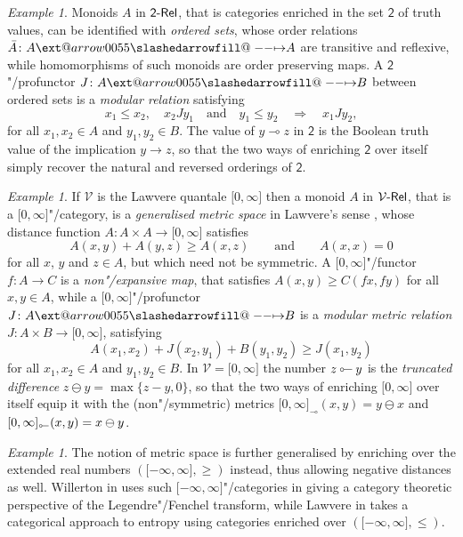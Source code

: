 \documentclass[preprint, a4paper]{elsarticle}
\makeatletter
\def\slashedarrowfill@#1#2#3#4#5{%
  $\m@th\thickmuskip0mu\medmuskip\thickmuskip\thinmuskip\thickmuskip
   \relax#5#1\mkern-7mu%
   \cleaders\hbox{$#5\mkern-2mu#2\mkern-2mu$}\hfill
   \mathclap{#3}\mathclap{#2}%
   \cleaders\hbox{$#5\mkern-2mu#2\mkern-2mu$}\hfill
   \mkern-7mu#4$%
}
\def\rightslashedarrowfill@{%
  \slashedarrowfill@\relbar\relbar\mapstochar\rightarrow}
\newcommand\xslashedrightarrow[2][]{%
  \ext@arrow 0055{\rightslashedarrowfill@}{#1}{#2}}
\def\slashedrightarrow{\xslashedrightarrow{}}
\newcommand{\dashcirc}{\multimap}
\newcommand{\circdash}{\mathbin{\text{\reflectbox{$\multimap$}}}}
\theoremstyle{definition}
\theoremstyle{remark}
\newtheorem{example}[theorem]{Example}
\renewcommand{\implies}{\Rightarrow}
\providecommand{\tdiff}{\ominus}
\providecommand{\brcs}[1]{\lbrace #1 \rbrace}
\providecommand{\brks}[1]{\lbrack #1 \rbrack}
\providecommand{\set}[1]{\brcs{#1}}
\providecommand{\map}[3]{#1\colon#2\to#3}
\providecommand{\hmap}[3]{#1\colon#2\slashedrightarrow#3}
\providecommand{\catvar}[1]{\mathcal{#1}}
\providecommand{\2}{\mathsf 2}
\providecommand{\V}{\catvar V}
\providecommand{\Rel}{\mathsf{Rel}}
\providecommand{\enRel}[1]{#1\text-\Rel}
\makeatother
\begin{document}
	\begin{example} \label{modular relation}
  	Monoids $A$ in $\enRel\2$, that is categories enriched in the set $\2$ of truth values, can be identified with \emph{ordered sets}, whose order relations $\hmap{\bar A}AA$ are transitive and reflexive, while homomorphisms of such monoids are order preserving maps. A $\2$"/profunctor $\hmap JAB$ between ordered sets is a \emph{modular relation} satisfying
  	\begin{displaymath}
  		x_1 \leq x_2, \quad x_2Jy_1 \quad \text{and} \quad y_1 \leq y_2 \quad \implies \quad x_1Jy_2,
  	\end{displaymath}
  	for all $x_1, x_2 \in A$ and $y_1, y_2 \in B$. The value of $y \dashcirc z$ in $\2$ is the Boolean truth value of the implication $y \to z$, so that the two ways of enriching $\2$ over itself simply recover the natural and reversed orderings of $\2$.
  \end{example}
  
  \begin{example}	\label{non-expansive relation}
  	If $\V$ is the Lawvere quantale $\brks{0, \infty}$ then a monoid $A$ in $\enRel\V$, that is a $\brks{0, \infty}$"/category, is a \emph{generalised metric space} in Lawvere's sense \cite{Lawvere73}, whose distance function $\map A{A \times A}{\brks{0, \infty}}$ satisfies
  	\begin{displaymath}
  		A(x, y) + A(y, z) \geq A(x, z) \qquad \text{and} \qquad A(x, x) = 0
  	\end{displaymath}
  	for all $x$, $y$ and $z \in A$, but which need not be symmetric. A $\brks{0, \infty}$"/functor $\map fAC$ is a \emph{non"/expansive map}, that satisfies $A(x,y) \geq C(fx, fy)$ for all $x, y \in A$, while a $\brks{0, \infty}$"/profunctor $\hmap JAB$ is a \emph{modular metric relation} $\map J{A \times B}{\brks{0, \infty}}$, satisfying
  	\begin{displaymath}
  		A(x_1, x_2) + J(x_2, y_1) + B(y_1, y_2) \geq J(x_1, y_2)
  	\end{displaymath}
  	for all $x_1, x_2 \in A$ and $y_1, y_2 \in B$. In $\V = \brks{0, \infty}$ the number $z \circdash y$ is the \emph{truncated difference} $z \tdiff y = \max \set{z - y, 0}$, so that the two ways of enriching $\brks{0, \infty}$ over itself equip it with the (non"/symmetric) metrics $\brks{0, \infty}_\dashcirc(x, y) = y \tdiff x$ and $\brks{0, \infty}_{\circdash}(x, y) = x \tdiff y$.
  \end{example}
  
  \begin{example}
  	The notion of metric space is further generalised by enriching over the extended real numbers $(\brks{-\infty, \infty}, \geq)$ instead, thus allowing negative distances as well. Willerton in \cite{Willerton15} uses such $\brks{-\infty, \infty}$"/categories in giving a category theoretic perspective of the Legendre"/Fenchel transform, while Lawvere in \cite{Lawvere84} takes a categorical approach to entropy using categories enriched over $(\brks{-\infty, \infty}, \leq)$.
  \end{example}
  
\end{document}
